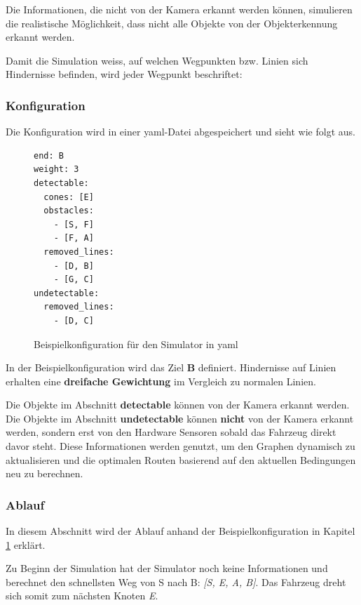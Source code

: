 \documentclass[../main.tex]{subfiles}
\begin{document}
Die Informationen, die nicht von der Kamera erkannt werden können, simulieren die realistische Möglichkeit, dass nicht alle Objekte von der Objekterkennung erkannt werden.  

Damit die Simulation weiss, auf welchen Wegpunkten bzw. Linien sich Hindernisse befinden, wird jeder Wegpunkt beschriftet:


\subsubsection{Konfiguration} \label{sim:Konfiguration}

Die Konfiguration wird in einer \acrshort{yaml}-Datei abgespeichert und sieht wie folgt aus.
\begin{figure}[H]
    \centering
\begin{verbatim}
end: B
weight: 3
detectable:
  cones: [E]
  obstacles: 
    - [S, F]
    - [F, A]
  removed_lines:
    - [D, B]
    - [G, C]
undetectable:
  removed_lines:
    - [D, C]
\end{verbatim}
    \label{fig:Beispielkonfiguration}
    \caption{Beispielkonfiguration für den Simulator in yaml}
\end{figure}

In der Beispielkonfiguration wird das Ziel \textbf{B} definiert. Hindernisse auf Linien erhalten eine \textbf{dreifache Gewichtung} im Vergleich zu normalen Linien.

Die Objekte im Abschnitt \textbf{detectable} können von der Kamera erkannt werden.
Die Objekte im Abschnitt \textbf{undetectable} können \textbf{nicht} von der Kamera erkannt werden, sondern erst von den Hardware Sensoren sobald das Fahrzeug direkt davor steht.
Diese Informationen werden genutzt, um den Graphen dynamisch zu aktualisieren und die optimalen Routen basierend auf den aktuellen Bedingungen neu zu berechnen.

\subsubsection{Ablauf}

In diesem Abschnitt wird der Ablauf anhand der Beispielkonfiguration in Kapitel \ref{fig:Beispielkonfiguration} erklärt.

Zu Beginn der Simulation hat der Simulator noch keine Informationen und berechnet den schnellsten Weg von S nach B: \textit{[S, E, A, B]}. Das Fahrzeug dreht sich somit zum nächsten Knoten \textit{E}.
\end{document}
